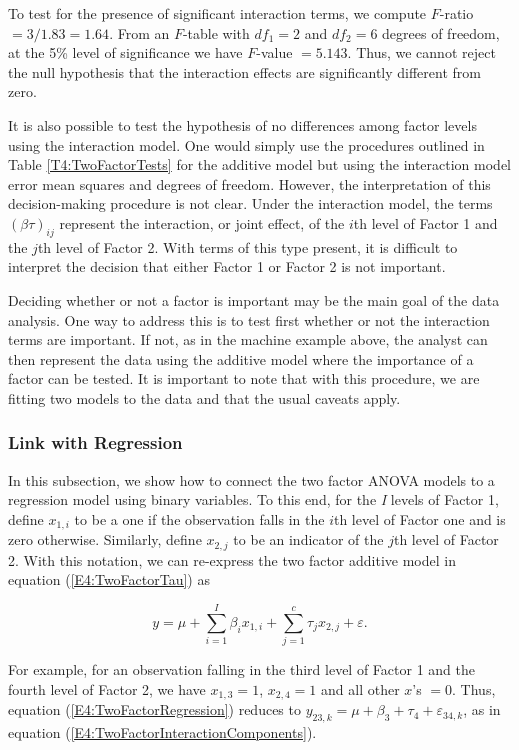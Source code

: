 To test for the presence of significant interaction terms, we
compute
$F$-ratio $=3/1.83=1.64$. From an $F$-table with $df_1=2$ and $%
df_2=6$ degrees of freedom, at the 5\% level of significance we have
$F$-value $=5.143$. Thus, we cannot reject the null hypothesis that
the interaction effects are significantly different from zero.

It is also possible to test the hypothesis of no differences among
factor levels using the interaction model. One would simply use the
procedures outlined in Table \ref{T4:TwoFactorTests} for the
additive model but using the interaction model error mean squares
and degrees of freedom. However, the interpretation of this
decision-making procedure is not clear. Under the interaction model,
the terms $(\beta \tau )_{ij}$ represent the interaction, or joint
effect, of the $i$th level of Factor 1 and the $j$th level of Factor
2. With terms of this type present, it is difficult to interpret the
decision that either Factor 1 or Factor 2 is not important.

Deciding whether or not a factor is important may be the main goal
of the data analysis. One way to address this is to test first
whether or not the interaction terms are important. If not, as in
the machine example above, the analyst can then represent the data
using the additive model where the importance of a factor can be
tested. It is important to note that with this procedure, we are
fitting two models to the data and that the usual caveats apply.

\subsubsection*{Link with Regression}

In this subsection, we show how to connect the two factor ANOVA
models to a regression model using binary variables. To this end,
for the \textit{I} levels of Factor 1, define $x_{1,i}$ to be a one
if the observation falls in the $i$th level of Factor one and is
zero otherwise. Similarly, define $x_{2,j}$ to be an indicator of
the $j$th level of Factor 2. With this notation, we can re-express
the two factor additive model in equation (\ref{E4:TwoFactorTau}) as

\begin{equation} \label{E4:TwoFactorRegression}
y=\mu +\sum_{i=1}^{I}\beta_ix_{1,i}+\sum_{j=1}^{c}\tau_{j}x_{2,j} +
\varepsilon.
\end{equation}

For example, for an observation falling in the third level of Factor
1 and the fourth level of Factor 2, we have $x_{1,3}=1$, $x_{2,4}=1$
and all other $x$'s $=0$. Thus, equation
(\ref{E4:TwoFactorRegression}) reduces to $y_{23,k}=\mu +\beta
_3+\tau_{4}+\varepsilon_{34,k}$, as in equation
(\ref{E4:TwoFactorInteractionComponents}).

